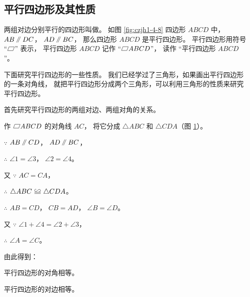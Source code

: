 \subsection{平行四边形及其性质}\label{subsec:czjh1-4-3}

两组对边分别平行的四边形叫做。
如图 \ref{fig:czjh1-4-8} 四边形 $ABCD$  中， $AB \pingxing DC$， $AD \pingxing BC$，
那么四边形 $ABCD$ 是平行四边形。
平行四边形用符号 “$\pxsbx$” 表示， 平行四边形 $ABCD$ 记作 “$\pxsbx ABCD$”，
读作 “平行四边形 $ABCD$”。

\begin{figure}[htbp]
    \centering
    \begin{minipage}[b]{7cm}
        \centering
        
        \caption{}\label{fig:czjh1-4-8}
    \end{minipage}
    \qquad
    \begin{minipage}[b]{7cm}
        \centering
        
        \caption{}\label{fig:czjh1-4-9}
    \end{minipage}
\end{figure}

下面研究平行四边形的一些性质。
我们已经学过了三角形，如果画出平行四边形的一条对角线，
就把平行四边形分成两个三角形，可以利用三角形的性质来研究平行四边形。

首先研究平行四边形的两组对边、两组对角的关系。

作 $\pxsbx ABCD$ 的对角线 $AC$， 将它分成 $\triangle ABC$ 和 $\triangle CDA$（图 \ref{fig:czjh1-4-9}）。

$\because$ \quad $AB \pingxing CD$， $AD \pingxing BC$，

$\therefore$ \quad $\angle 1 = \angle 3$， $\angle 2 = \angle 4$。

又 $\because$ \quad $AC = CA$，

$\therefore$ \quad $\triangle ABC \quandeng \triangle CDA$。

$\therefore$ \quad $AB = CD$， $CB = AD$， $\angle B = \angle D$。

又 $\because$ \quad $\angle 1 + \angle 4 = \angle 2 + \angle 3$，

$\therefore$ \quad $\angle A = \angle C$。

由此得到：

\begin{dingli}[平行四边形性质定理1]
    平行四边形的对角相等。
\end{dingli}

\begin{dingli}[平行四边形性质定理2]
    平行四边形的对边相等。
\end{dingli}

